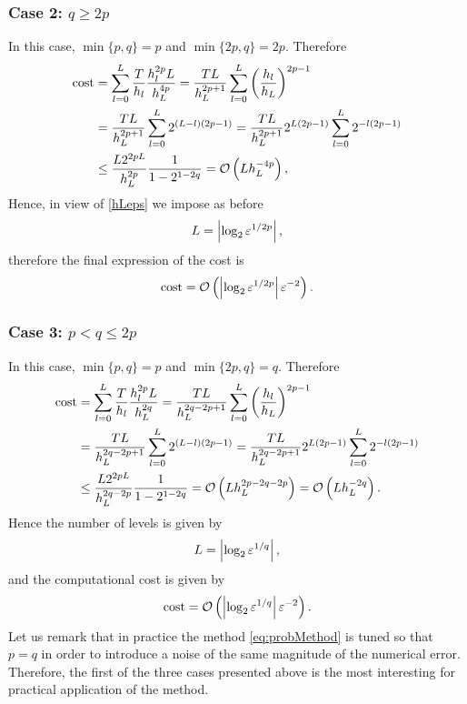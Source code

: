 \subsubsection*{Case 2: $q \geq 2p$}
In this case, $\min\{p, q\} = p$ and $\min\{2p, q\} = 2p$. Therefore
\begin{equation}
\begin{aligned}
\mathrm{cost} &=  \sum_{l=0}^L \frac{T}{h_l} \frac{h_l^{2p}L}{h_L^{4p}} = \frac{TL}{h_L^{2p+1}} \sum_{l=0}^L \left(\frac{h_l}{h_L}\right)^{2p-1} \\
&= \frac{TL}{h_L^{2p+1}} \sum_{l=0}^L 2^{(L-l)(2p-1)} = \frac{TL}{h_L^{2p+1}} 2^{L(2p-1)} \sum_{l=0}^L 2^{-l(2p-1)} \\
&\leq \frac{L2^{2pL}}{h_L^{2p}}\frac{1}{1 - 2^{1-2q}} = \mathcal{O}\left(L h_L^{-4p}\right),
\end{aligned}
\end{equation}
Hence, in view of \eqref{hLeps} we impose as before 
\begin{equation}
	L = \left|\log_2 \varepsilon^{1/2p}\right|,
\end{equation}
therefore the final expression of the cost is
\begin{equation}
	\mathrm{cost} = \mathcal{O}\left(\left|\log_2 \varepsilon^{1/2p}\right| \varepsilon^{-2}\right).
\end{equation}

\subsubsection*{Case 3: $p < q \leq 2p$}
In this case, $\min\{p, q\} = p$ and $\min\{2p, q\} = q$. Therefore
\begin{equation}
\begin{aligned}
\mathrm{cost} &=  \sum_{l=0}^L \frac{T}{h_l} \frac{h_l^{2p}L}{h_L^{2q}} = \frac{TL}{h_L^{2q - 2p+1}} \sum_{l=0}^L \left(\frac{h_l}{h_L}\right)^{2p-1} \\
&= \frac{TL}{h_L^{2q-2p+1}} \sum_{l=0}^L 2^{(L-l)(2p-1)} = \frac{TL}{h_L^{2q-2p+1}} 2^{L(2p-1)} \sum_{l=0}^L 2^{-l(2p-1)} \\
&\leq \frac{L2^{2pL}}{h_L^{2q-2p}}\frac{1}{1 - 2^{1-2q}} = \mathcal{O}\left(L h_L^{2p-2q-2p}\right) = \mathcal{O}\left(L h_L^{-2q}\right).
\end{aligned}
\end{equation}
Hence the number of levels is given by
\begin{equation}
	L = \left|\log_2 \varepsilon^{1/q} \right|,
\end{equation}
and the computational cost is given by
\begin{equation}
\mathrm{cost} = \mathcal{O}\left(\left|\log_2 \varepsilon^{1/q}\right| \varepsilon^{-2}\right).
\end{equation}
Let us remark that in practice the method \eqref{eq:probMethod} is tuned so that $p = q$ in order to introduce a noise of the same magnitude of the numerical error. Therefore, the first of the three cases presented above is the most interesting for practical application of the method.

